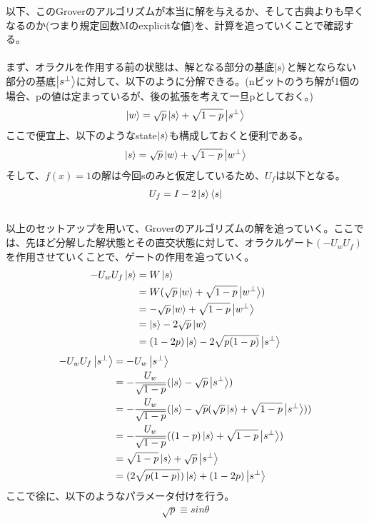 \documentclass[a4paper,10.5pt]{article}
\numberwithin{equation}{section}
\begin{document}
以下、このGroverのアルゴリズムが本当に解を与えるか、そして古典よりも早くなるのか(つまり規定回数Mのexplicitな値)を、計算を追っていくことで確認する。\\
\\
まず、オラクルを作用する前の状態は、解となる部分の基底$\ket{s}$と解とならない部分の基底$\ket{s^{\perp}}$に対して、以下のように分解できる。(nビットのうち解が1個の場合、pの値は定まっているが、後の拡張を考えて一旦pとしておく。)
\begin{align*}
    \ket{w}=\sqrt{p}\ket{s}+\sqrt{1-p}\ket{s^{\perp}}
\end{align*}
ここで便宜上、以下のようなstate$\ket{s}$も構成しておくと便利である。
\begin{align*}
    \ket{s}=\sqrt{p}\ket{w}+\sqrt{1-p}\ket{w^{\perp}}
\end{align*}
そして、$f(x)=1$の解は今回sのみと仮定しているため、$U_{f}$は以下となる。
\begin{align*}
    U_{f}=I-2\ket{s}\bra{s}
\end{align*}
\\
以上のセットアップを用いて、Groverのアルゴリズムの解を追っていく。ここでは、先ほど分解した解状態とその直交状態に対して、オラクルゲート$(-U_{w}U_{f})$を作用させていくことで、ゲートの作用を追っていく。
\begin{align*}
    -U_{w}U_{f}\ket{s}&=W\ket{s}\\
    &=W(\sqrt{p}\ket{w}+\sqrt{1-p}\ket{w^{\perp}})\\
    &=-\sqrt{p}\ket{w}+\sqrt{1-p}\ket{w^{\perp}}\\
    &=\ket{s}-2\sqrt{p}\ket{w}\\
    &=(1-2p)\ket{s}-2\sqrt{p(1-p)}\ket{s^{\perp}}
\end{align*}
\begin{align*}
    -U_{w}U_{f}\ket{s^{\perp}}
    &=-U_{w}\ket{s^{\perp}}\\
    &=-\frac{U_{w}}{\sqrt{1-p}}(\ket{s}-\sqrt{p}\ket{s^{\perp}})\\
    &=-\frac{U_{w}}{\sqrt{1-p}}(\ket{s}-\sqrt{p}(\sqrt{p}\ket{s}+\sqrt{1-p}\ket{s^{\perp}}))\\
    &=-\frac{U_{w}}{\sqrt{1-p}}((1-p)\ket{s}+\sqrt{1-p}\ket{s^{\perp}})\\
    &=\sqrt{1-p}\ket{s}+\sqrt{p}\ket{s^{\perp}}\\
    &=(2\sqrt{p(1-p)})\ket{s}+(1-2p)\ket{s^{\perp}}
\end{align*}
ここで徐に、以下のようなパラメータ付けを行う。
\begin{align*}
    \sqrt{p}\equiv sin\theta
\end{align*}
\end{document}
